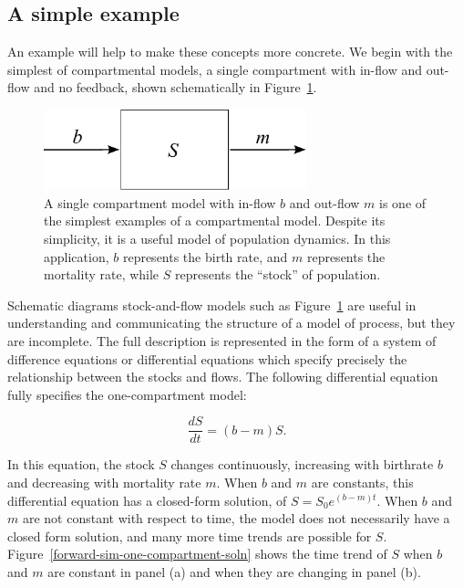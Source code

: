 \subsection{A simple example}

An example will help to make these concepts more concrete.  We begin
with the simplest of compartmental models, a single compartment with
in-flow and out-flow and no feedback, shown schematically in
Figure~\ref{forward-sim-one-compartment}.

\begin{figure}[h]
\begin{center}
\includegraphics[width=3in]{S.pdf}
\caption{A single compartment model with in-flow $b$ and out-flow $m$
  is one of the simplest examples of a compartmental model. Despite
  its simplicity, it is a useful model of population dynamics.  In
  this application, $b$ represents the birth rate, and $m$ represents
  the mortality rate, while $S$ represents the ``stock'' of
  population.}
\label{forward-sim-one-compartment}
\end{center}
\end{figure}


Schematic diagrams stock-and-flow models such as
Figure~\ref{forward-sim-one-compartment} are useful in understanding
and communicating the structure of a model of process, but they are
incomplete. The full description is represented in the form of a
system of difference equations or differential equations which specify
precisely the relationship between the stocks and flows. The following
differential equation fully specifies the one-compartment model:

\[
\frac{dS}{dt} = (b - m)S.
\]

In this equation, the stock $S$ changes continuously, increasing with
birthrate $b$ and decreasing with mortality rate $m$. When $b$ and $m$
are constants, this differential equation has a closed-form solution,
of $S = S_0 e^{(b-m)t}$. When $b$ and $m$ are not constant with
respect to time, the model does not necessarily have a closed form
solution, and many more time trends are possible for $S$.
Figure~\ref{forward-sim-one-compartment-soln} shows the time trend of
$S$ when $b$ and $m$ are constant in panel (a) and when they are
changing in panel (b).

